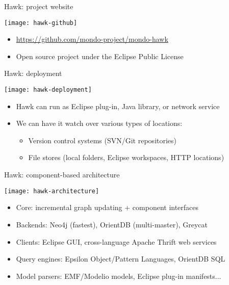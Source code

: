 \begin{frame}{Hawk: project website}
  \begin{center}
    \texttt{[image: hawk-github]}
  \end{center}

  \begin{itemize}
  \item \url{https://github.com/mondo-project/mondo-hawk}
  \item Open source project under the Eclipse Public License
  \end{itemize}
\end{frame}

\begin{frame}{Hawk: deployment}

  \begin{center}
    \texttt{[image: hawk-deployment]}
  \end{center}

  \begin{itemize}
  \item Hawk can run as Eclipse plug-in, Java library, or network service
  \item We can have it watch over various types of locations:
    \begin{itemize}
    \item Version control systems (SVN/Git repositories)
    \item File stores (local folders, Eclipse workspaces, HTTP locations)
    \end{itemize}
  \end{itemize}

\end{frame}

\begin{frame}{Hawk: component-based architecture}
  \begin{center}
    \texttt{[image: hawk-architecture]}
  \end{center}

  \begin{itemize}
  \item Core: incremental graph updating + component interfaces
  \item Backends: Neo4j (fastest), OrientDB (multi-master), Greycat
  \item Clients: Eclipse GUI, cross-language Apache Thrift web services
  \item Query engines: Epsilon Object/Pattern Languages, OrientDB SQL
  \item Model parsers: EMF/Modelio models, Eclipse plug-in manifests...
  \end{itemize}
\end{frame}

